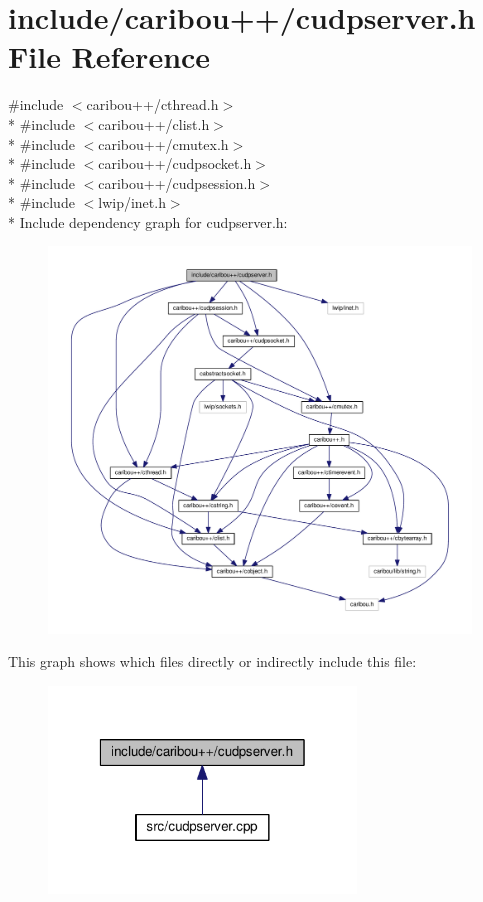 \section{include/caribou++/cudpserver.h File Reference}
\label{cudpserver_8h}
{\ttfamily \#include $<$caribou++/cthread.\-h$>$}\\*
{\ttfamily \#include $<$caribou++/clist.\-h$>$}\\*
{\ttfamily \#include $<$caribou++/cmutex.\-h$>$}\\*
{\ttfamily \#include $<$caribou++/cudpsocket.\-h$>$}\\*
{\ttfamily \#include $<$caribou++/cudpsession.\-h$>$}\\*
{\ttfamily \#include $<$lwip/inet.\-h$>$}\\*
Include dependency graph for cudpserver.\-h\-:\nopagebreak
\begin{figure}[H]
\begin{center}
\leavevmode
\includegraphics[width=350pt]{cudpserver_8h__incl}
\end{center}
\end{figure}
This graph shows which files directly or indirectly include this file\-:\nopagebreak
\begin{figure}[H]
\begin{center}
\leavevmode
\includegraphics[width=232pt]{cudpserver_8h__dep__incl}
\end{center}
\end{figure}

